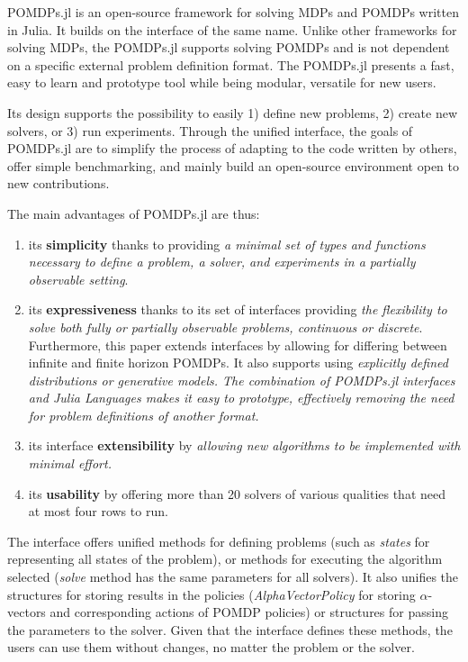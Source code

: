 POMDPs.jl \cite{egorov2017pomdps} is an open-source framework for solving MDPs and POMDPs written in Julia. It builds on the interface of the same name. Unlike other frameworks for solving MDPs, the POMDPs.jl supports solving POMDPs and is not dependent on a specific external problem definition format. The POMDPs.jl presents a fast, easy to learn and prototype tool while being modular, versatile for new users.


Its design supports the possibility to easily 1) define new problems, 2) create new solvers, or 3) run experiments. Through the unified interface, the goals of POMDPs.jl are to simplify the process of adapting to the code written by others, offer simple benchmarking, and mainly build an open-source environment open to new contributions.

The main advantages of POMDPs.jl are thus: 
\begin{enumerate}
    \item its \textbf{simplicity} thanks to providing \textit{a minimal set of types and functions necessary to define a problem, a solver, and experiments in a partially observable setting}.
    \item its \textbf{expressiveness} thanks to its set of interfaces providing \textit{the flexibility to solve both fully or partially observable problems, continuous or discrete}. Furthermore, this paper extends interfaces by allowing for differing between infinite and finite horizon POMDPs. It also supports using \textit{explicitly defined distributions or generative models. The combination of POMDPs.jl interfaces and Julia Languages makes it easy to prototype, effectively removing the need for problem definitions of another format.}
    \item its interface \textbf{extensibility} by \textit{allowing new algorithms to be implemented with minimal effort.}
    \item its \textbf{usability} by offering more than 20 solvers of various qualities that need at most four rows to run. 
\end{enumerate} 





The interface offers unified methods for defining problems (such as \textit{states} for representing all states of the problem), or methods for executing the algorithm selected (\textit{solve} method has the same parameters for all solvers). It also unifies the structures for storing results in the policies (\textit{AlphaVectorPolicy} for storing $\alpha$-vectors and corresponding actions of POMDP policies) or structures for passing the parameters to the solver. Given that the interface defines these methods, the users can use them without changes, no matter the problem or the solver.




